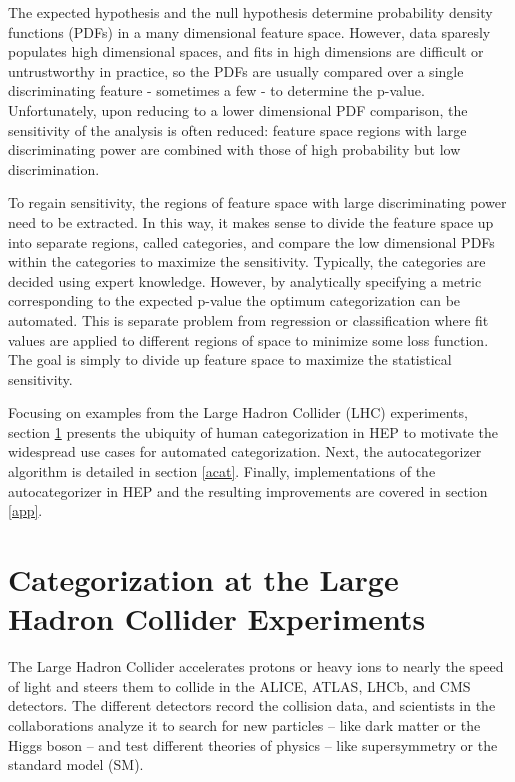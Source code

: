 \documentclass[review]{elsarticle}
\begin{document}
The expected hypothesis and the null hypothesis determine probability density functions (PDFs) in a many dimensional feature space. However, data sparesly populates high dimensional spaces, and fits in high dimensions are difficult or untrustworthy in practice, so the PDFs are usually compared over a single discriminating feature - sometimes a few - to determine the p-value. Unfortunately, upon reducing to a lower dimensional PDF comparison, the sensitivity of the analysis is often reduced: feature space regions with large discriminating power are combined with those of high probability but low discrimination.

To regain sensitivity, the regions of feature space with large discriminating power need to be extracted. In this way, it makes sense to divide the feature space up into separate regions, called categories, and compare the low dimensional PDFs within the categories to maximize the sensitivity. Typically, the categories are decided using expert knowledge. However, by analytically specifying a metric corresponding to the expected p-value the optimum categorization can be automated. This is separate problem from regression or classification where fit values are applied to different regions of space to minimize some loss function. The goal is simply to divide up feature space to maximize the statistical sensitivity.

Focusing on examples from the Large Hadron Collider (LHC) experiments, section \ref{chep} presents the ubiquity of human categorization in HEP to motivate the widespread use cases for automated categorization. Next, the autocategorizer algorithm is detailed in section \ref{acat}. Finally, implementations of the autocategorizer in HEP and the resulting improvements are covered in section \ref{app}.

\section{Categorization at the Large Hadron Collider Experiments}
\label{chep}
The Large Hadron Collider accelerates protons or heavy ions to nearly the speed of light and steers them to collide in the 
ALICE, ATLAS, LHCb, and CMS detectors. The different detectors record the collision data, 
and scientists in the collaborations analyze it to search for new particles -- like dark matter or the Higgs boson -- 
and test different theories of physics -- like supersymmetry or the standard model (SM). 
\end{document}
